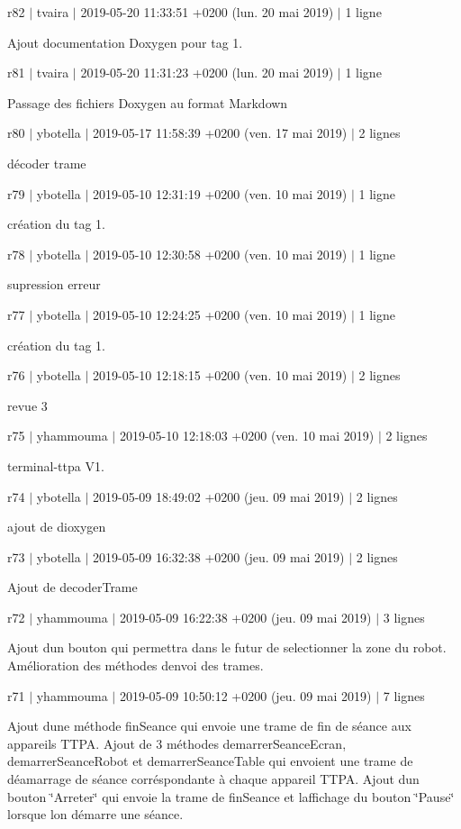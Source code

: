 r82 $\vert$ tvaira $\vert$ 2019-\/05-\/20 11\+:33\+:51 +0200 (lun. 20 mai 2019) $\vert$ 1 ligne

Ajout documentation Doxygen pour tag 1.

r81 $\vert$ tvaira $\vert$ 2019-\/05-\/20 11\+:31\+:23 +0200 (lun. 20 mai 2019) $\vert$ 1 ligne

Passage des fichiers Doxygen au format Markdown

r80 $\vert$ ybotella $\vert$ 2019-\/05-\/17 11\+:58\+:39 +0200 (ven. 17 mai 2019) $\vert$ 2 lignes

décoder trame

r79 $\vert$ ybotella $\vert$ 2019-\/05-\/10 12\+:31\+:19 +0200 (ven. 10 mai 2019) $\vert$ 1 ligne

création du tag 1.

r78 $\vert$ ybotella $\vert$ 2019-\/05-\/10 12\+:30\+:58 +0200 (ven. 10 mai 2019) $\vert$ 1 ligne

supression erreur

r77 $\vert$ ybotella $\vert$ 2019-\/05-\/10 12\+:24\+:25 +0200 (ven. 10 mai 2019) $\vert$ 1 ligne

création du tag 1.

r76 $\vert$ ybotella $\vert$ 2019-\/05-\/10 12\+:18\+:15 +0200 (ven. 10 mai 2019) $\vert$ 2 lignes

revue 3

r75 $\vert$ yhammouma $\vert$ 2019-\/05-\/10 12\+:18\+:03 +0200 (ven. 10 mai 2019) $\vert$ 2 lignes

terminal-\/ttpa V1.

r74 $\vert$ ybotella $\vert$ 2019-\/05-\/09 18\+:49\+:02 +0200 (jeu. 09 mai 2019) $\vert$ 2 lignes

ajout de dioxygen

r73 $\vert$ ybotella $\vert$ 2019-\/05-\/09 16\+:32\+:38 +0200 (jeu. 09 mai 2019) $\vert$ 2 lignes

Ajout de decoder\+Trame

r72 $\vert$ yhammouma $\vert$ 2019-\/05-\/09 16\+:22\+:38 +0200 (jeu. 09 mai 2019) $\vert$ 3 lignes

Ajout d\textquotesingle{}un bouton qui permettra dans le futur de selectionner la zone du robot. Amélioration des méthodes d\textquotesingle{}envoi des trames.

r71 $\vert$ yhammouma $\vert$ 2019-\/05-\/09 10\+:50\+:12 +0200 (jeu. 09 mai 2019) $\vert$ 7 lignes

Ajout d\textquotesingle{}une méthode fin\+Seance qui envoie une trame de fin de séance aux appareils T\+T\+PA. Ajout de 3 méthodes demarrer\+Seance\+Ecran, demarrer\+Seance\+Robot et demarrer\+Seance\+Table qui envoient une trame de déamarrage de séance corréspondante à chaque appareil T\+T\+PA. Ajout d\textquotesingle{}un bouton \char`\"{}\+Arreter\char`\"{} qui envoie la trame de fin\+Seance et l\textquotesingle{}affichage du bouton \char`\"{}\+Pause\char`\"{} lorsque l\textquotesingle{}on démarre une séance.

